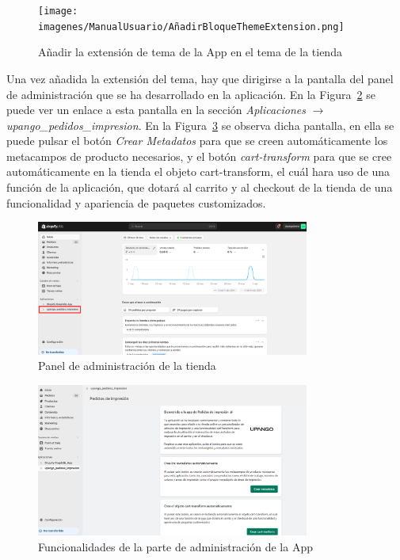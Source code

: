 \documentclass[12pt]{article}
\begin{document}
\begin{figure}[ht]
    \centering
    \texttt{[image: imagenes/ManualUsuario/AñadirBloqueThemeExtension.png]}
    \caption{\label{fig:ThemeAppExtension}Añadir la extensión de tema de la App en el tema de la tienda}
    \vspace{\fill}
\end{figure}

Una vez añadida la extensión del tema, hay que dirigirse a la pantalla del panel de administración que se ha desarrollado en la aplicación. En la Figura~\ref{fig:PanelAdministracion} se puede
ver un enlace a esta pantalla en la sección \textit{Aplicaciones} $\rightarrow$  \textit{upango\_pedidos\_impresion}. En la Figura~\ref{fig:FuncionalidadAdministracion} se observa dicha pantalla, en ella se puede pulsar el botón \textit{Crear Metadatos} para que se creen 
automáticamente los metacampos de producto necesarios, y el botón \textit{cart-transform} para que se cree automáticamente en la tienda el objeto cart-transform, el cuál hara uso de una función de la aplicación, que 
dotará al carrito y al checkout de la tienda de una funcionalidad y apariencia de paquetes customizados.

\begin{figure}[ht]
    \centering
    \includegraphics[width=0.8\textwidth]{imagenes/ManualUsuario/PaginaAdministracion.png}
    \caption{\label{fig:PanelAdministracion}Panel de administración de la tienda}
    \vspace{\fill}
\end{figure}

\begin{figure}[ht]
    \centering
    \includegraphics[width=0.8\textwidth]{imagenes/ManualUsuario/FuncionalidadPaginaAdministracion.png}
    \caption{\label{fig:FuncionalidadAdministracion}Funcionalidades de la parte de administración de la App}
    \vspace{\fill}
\end{figure}
\end{document}

